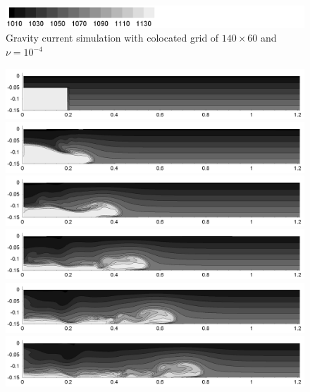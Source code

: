 \begin{figure}[htbp]
\begin{center}
\includegraphics[scale=0.55]{../figures/colocated/Fig9case/label.png}
    \caption{Gravity current simulation with colocated grid of $140 \times 60$ and $\nu=10^{-4}$}
    \label{fig:140-60-03-VE-4}
  \end{center}
\end{figure}


\begin{figure}[htbp]
  \begin{center}    \includegraphics[scale=0.55]{../figures/colocated/Fig9case/140-60-03-VE-5/01.png}    \includegraphics[scale=0.55]{../figures/colocated/Fig9case/140-60-03-VE-5/02.png}
\includegraphics[scale=0.55]{../figures/colocated/Fig9case/140-60-03-VE-5/03.png}
\includegraphics[scale=0.55]{../figures/colocated/Fig9case/140-60-03-VE-5/04.png}    \includegraphics[scale=0.55]{../figures/colocated/Fig9case/140-60-03-VE-5/05.png}
\includegraphics[scale=0.55]{../figures/colocated/Fig9case/140-60-03-VE-5/06.png}

\end{center}
\end{figure}
